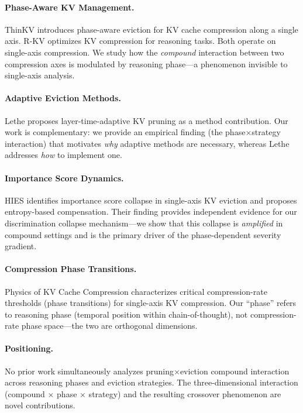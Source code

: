 \documentclass[11pt,a4paper]{article}
\begin{document}
\paragraph{Phase-Aware KV Management.} ThinKV \cite{thinkv2025} introduces phase-aware eviction for KV cache compression along a single axis. R-KV \cite{rkv2025} optimizes KV compression for reasoning tasks. Both operate on single-axis compression. We study how the \emph{compound} interaction between two compression axes is modulated by reasoning phase---a phenomenon invisible to single-axis analysis.

\paragraph{Adaptive Eviction Methods.} Lethe \cite{lethe2026} proposes layer-time-adaptive KV pruning as a method contribution. Our work is complementary: we provide an empirical finding (the phase$\times$strategy interaction) that motivates \emph{why} adaptive methods are necessary, whereas Lethe addresses \emph{how} to implement one.

\paragraph{Importance Score Dynamics.} HIES \cite{hies2025} identifies importance score collapse in single-axis KV eviction and proposes entropy-based compensation. Their finding provides independent evidence for our discrimination collapse mechanism---we show that this collapse is \emph{amplified} in compound settings and is the primary driver of the phase-dependent severity gradient.

\paragraph{Compression Phase Transitions.} Physics of KV Cache Compression \cite{physicskv2026} characterizes critical compression-rate thresholds (phase transitions) for single-axis KV compression. Our ``phase'' refers to reasoning phase (temporal position within chain-of-thought), not compression-rate phase space---the two are orthogonal dimensions.

\paragraph{Positioning.} No prior work simultaneously analyzes pruning$\times$eviction compound interaction across reasoning phases and eviction strategies. The three-dimensional interaction (compound $\times$ phase $\times$ strategy) and the resulting crossover phenomenon are novel contributions.
\end{document}
